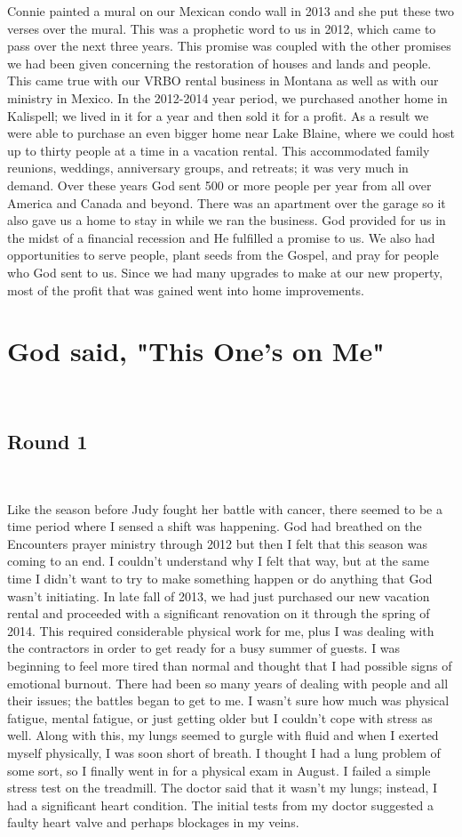 \documentclass[oneside]{book}
\begin{document}
Connie painted a mural on our Mexican condo wall in 2013 and she put these two verses over the mural. This was a prophetic word to us in 2012, which came to pass over the next three years. This promise was coupled with the other promises we had been given concerning the restoration of houses and lands and people. This came true with our VRBO rental business in Montana as well as with our ministry in Mexico. In the 2012-2014 year period, we purchased another home in Kalispell; we lived in it for a year and then sold it for a profit. As a result we were able to purchase an even bigger home near Lake Blaine, where we could host up to thirty people at a time in a vacation rental. This accommodated family reunions, weddings, anniversary groups, and retreats; it was very much in demand. Over these years God sent 500 or more people per year from all over America and Canada and beyond. There was an apartment over the garage so it also gave us a home to stay in while we ran the business. God provided for us in the midst of a financial recession and He fulfilled a promise to us. We also had opportunities to serve people, plant seeds from the Gospel, and pray for people who God sent to us. Since we had many upgrades to make at our new property, most of the profit that was gained went into home improvements. 


\chapter{God said, "This One's on Me"}
\

\section*{Round 1}
\

Like the season before Judy fought her battle with cancer, there seemed to be a time period where I sensed a shift was happening. God had breathed on the Encounters prayer ministry through 2012 but then I felt that this season was coming to an end. I couldn’t understand why I felt that way, but at the same time I didn’t want to try to make something happen or do anything that God wasn’t initiating. In late fall of 2013, we had just purchased our new vacation rental and proceeded with a significant renovation on it through the spring of 2014. This required considerable physical work for me, plus I was dealing with the contractors in order to get ready for a busy summer of guests. I was beginning to feel more tired than normal and thought that I had possible signs of emotional burnout. There had been so many years of dealing with people and all their issues; the battles began to get to me. I wasn’t sure how much was physical fatigue, mental fatigue, or just getting older but I couldn’t cope with stress as well. Along with this, my lungs seemed to gurgle with fluid and when I exerted myself physically, I was soon short of breath. I thought I had a lung problem of some sort, so I finally went in for a physical exam in August. I failed a simple stress test on the treadmill. The doctor said that it wasn’t my lungs; instead, I had a significant heart condition. The initial tests from my doctor suggested a faulty heart valve and perhaps blockages in my veins. 
\end{document}
